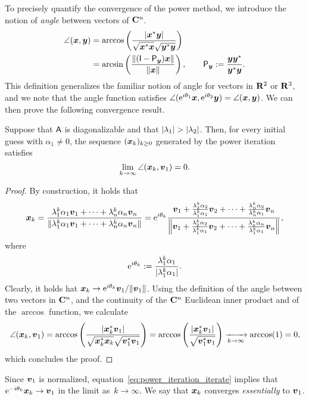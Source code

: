 To precisely quantify the convergence of the power method,
we introduce the notion of \emph{angle} between vectors of $\mathbf C^n$.
\begin{align*}
    \angle(\mathbf{\boldsymbol{x}}, \mathbf{\boldsymbol{y}})
    &= \arccos\left( \frac{\lvert\mathbf{\boldsymbol{x}}^* \mathbf{\boldsymbol{y}}\rvert}{\sqrt{\mathbf{\boldsymbol{x}}^* \mathbf{\boldsymbol{x}}} \sqrt{\mathbf{\boldsymbol{y}}^* \mathbf{\boldsymbol{y}}}}\right) \\
    &= \arcsin\left( \frac{\lVert(\mathsf I - \mathsf P_{\mathbf{\boldsymbol{y}}}) \mathbf{\boldsymbol{x}}\rVert} {\lVert\mathbf{\boldsymbol{x}}\rVert} \right),
    \qquad \mathsf P_{\mathbf{\boldsymbol{y}}} := \frac{\mathbf{\boldsymbol{y}} \mathbf{\boldsymbol{y}}^*}{\mathbf{\boldsymbol{y}}^* \mathbf{\boldsymbol{y}}}.
\end{align*}
This definition generalizes the familiar notion of angle for vectors in $\mathbf R^2$ or $\mathbf R^3$,
and we note that the angle function satisfies $\angle(\mathrm e^{i \theta_1} \mathbf{\boldsymbol{x}}, \mathrm e^{i \theta_2} \mathbf{\boldsymbol{y}}) = \angle(\mathbf{\boldsymbol{x}}, \mathbf{\boldsymbol{y}})$.
We can then prove the following convergence result.
\begin{proposition}
    \label{proposition:convergence_of_the_power_iteration}
    Suppose that $\mathsf A$ is diagonalizable and that $\lvert\lambda_1\rvert > \lvert\lambda_2\rvert$.
    Then, for every initial guess with $\alpha_1 \neq 0$,
    the sequence $(\mathbf{\boldsymbol{x}}_k)_{k \geq 0}$ generated by the power iteration satisfies
    \[
        \lim_{k \to \infty} \angle(\mathbf{\boldsymbol{x}}_k, \mathbf{\boldsymbol{v}}_1) = 0.
    \]
\end{proposition}
\begin{proof}
    By construction,
    it holds that
    \begin{equation}
        \label{eq:power_iteration_iterate}
        \vect x_k
        = \frac{\lambda_1^k \alpha_1 \vect v_1 + \dotsb + \lambda_n^k \alpha_n \vect v_n}{\norm{\lambda_1^k \alpha_1 \vect v_1 + \dotsb + \lambda_n^k \alpha_n \vect v_n}}
        = \e^{i \theta_k} \frac{\vect v_1 + \frac{\lambda_2^k \alpha_2}{\lambda_1^k \alpha_1} \vect v_2 +  \dotsb + \frac{\lambda_n^k \alpha_2}{\lambda_n^k \alpha_1} \vect v_n }{\norm*{\vect v_1 + \frac{\lambda_2^k \alpha_2}{\lambda_1^k \alpha_1} \vect v_2 +  \dotsb + \frac{\lambda_n^k \alpha_n}{\lambda_1^k \alpha_1} \vect v_n}},
    \end{equation}
    where
    \[
        \mathrm e^{i \theta_k} := \frac{\lambda_1^k \alpha_1}{\lvert\lambda_1^k \alpha_1\rvert}.
    \]
    Clearly, it holds hat $\mathbf{\boldsymbol{x}}_k \to \mathrm e^{i \theta_k} \mathbf{\boldsymbol{v}}_1/ \lVert\mathbf{\boldsymbol{v}}_1\rVert$.
    Using the definition of the angle between two vectors in $\mathbf C^n$,
    and the continuity of the $\mathbf C^n$ Euclidean inner product and of the $\arccos$ function,
    we calculate
    \[
        \angle(\mathbf{\boldsymbol{x}}_k, \mathbf{\boldsymbol{v}}_1)
        = \arccos\left( \frac{\lvert\mathbf{\boldsymbol{x}}_k^* \mathbf{\boldsymbol{v}}_1\rvert}{\sqrt{\mathbf{\boldsymbol{x}}_k^* \mathbf{\boldsymbol{x}}_k} \sqrt{\mathbf{\boldsymbol{v}}_1^* \mathbf{\boldsymbol{v}}_1}}\right)
        = \arccos\left( \frac{\lvert\mathbf{\boldsymbol{x}}_k^* \mathbf{\boldsymbol{v}}_1\rvert}{\sqrt{\mathbf{\boldsymbol{v}}_1^* \mathbf{\boldsymbol{v}}_1}} \right)
        \xrightarrow[k \to \infty]{} \arccos(1) = 0,
    \]
    which concludes the proof.
\end{proof}
Since $\mathbf{\boldsymbol{v}}_1$ is normalized,
equation~\eqref{eq:power_iteration_iterate} implies that $\mathrm e^{-i \theta_k} \mathbf{\boldsymbol{x}}_k \to \mathbf{\boldsymbol{v}}_1$ in the limit as~$k \to \infty$.
We say that $\mathbf{\boldsymbol{x}}_k$ converges \emph{essentially} to $\mathbf{\boldsymbol{v}}_1$.

